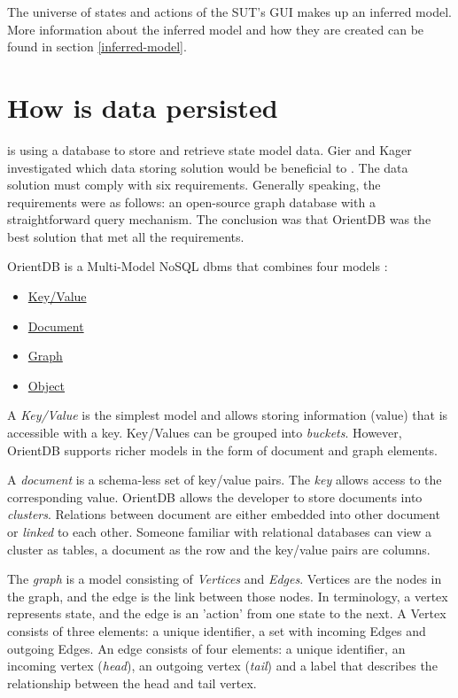 The universe of states and actions of the SUT's GUI makes up an inferred model. More information about the inferred model and how they are created can be found in section \ref{inferred-model}.

\section{How is data persisted}

\testar is using a database to store and retrieve state model data. Gier and Kager investigated which data storing solution would be beneficial to \testar \cite{GierKager}. The data solution must comply with six requirements. Generally speaking, the requirements were as follows: an open-source graph database with a straightforward query mechanism. The conclusion was that OrientDB was the best solution that met all the requirements.

\begin{samepage}
OrientDB is a Multi-Model NoSQL \acrfull{dbms} that combines four models \cite{orientDbModeling}:

\begin{itemize}
    \item \hyperlink{db:key-value}{Key/Value}
    \item \hyperlink{db:document}{Document}
    \item \hyperlink{db:graph}{Graph}
    \item \hyperlink{db:object}{Object}
\end{itemize}
\end{samepage}

A \hypertarget{db:key-value}{\emph{Key/Value}} is the simplest model and allows storing information (value) that is accessible with a key. Key/Values can be grouped into \textit{buckets}. However, OrientDB supports richer models in the form of document and graph elements.

A \hypertarget{db:document}{\emph{document}} is a schema-less set of key/value pairs. The \emph{key} allows access to the corresponding value. OrientDB allows the developer to store documents into \emph{clusters}. Relations between document are either embedded into other document or \emph{linked} to each other. Someone familiar with relational databases can view a cluster as tables, a document as the row and the key/value pairs are columns.

The \hypertarget{db:graph}{\emph{graph}} is a model consisting of \emph{Vertices} and \emph{Edges}. Vertices are the nodes in the graph, and the edge is the link between those nodes. In \testar terminology, a vertex represents state, and the edge is an 'action' from one state to the next. A Vertex consists of three elements: a unique identifier, a set with incoming Edges and outgoing Edges. An edge consists of four elements: a unique identifier, an incoming vertex (\emph{head}), an outgoing vertex (\emph{tail}) and a label that describes the relationship between the head and tail vertex.\par

